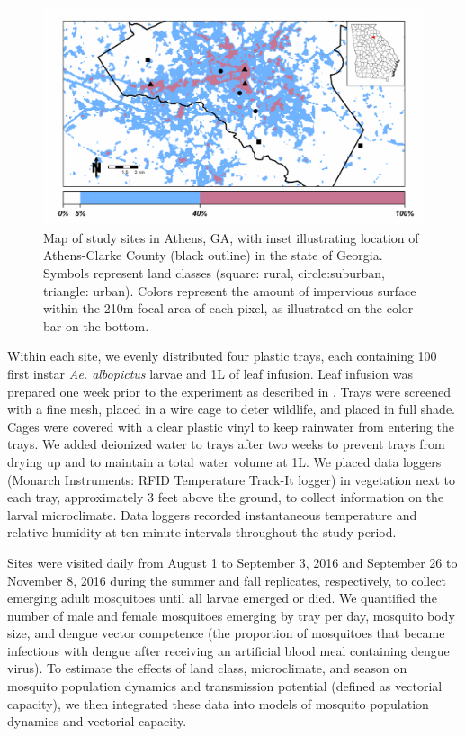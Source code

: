 \documentclass[12pt]{article}
\begin{document}
\begin{figure}
\centering\includegraphics[width=0.9\linewidth]{Figure1.pdf}
\caption{Map of study sites in Athens, GA, with inset illustrating location of Athens-Clarke County (black outline) in the state of Georgia. Symbols represent land classes (square: rural, circle:suburban, triangle: urban). Colors represent the amount of impervious surface within the 210m focal area of each pixel, as illustrated on the color bar on the bottom.}
\label{Fig:siteMap}
\end{figure}

Within each site, we evenly distributed four plastic trays, each containing 100 first instar \textit{Ae. albopictus} larvae and 1L of leaf infusion. Leaf infusion was prepared one week prior to the experiment as described in \citet{murdock2017}.  Trays were screened with a fine mesh, placed in a wire cage to deter wildlife, and placed in full shade. Cages were covered with a clear plastic vinyl to keep rainwater from entering the trays. We added deionized water to trays after two weeks to prevent trays from drying up and to maintain a total water volume at 1L. We placed data loggers (Monarch Instruments: RFID Temperature Track-It logger) in vegetation next to each tray, approximately 3 feet above the ground, to collect information on the larval microclimate. Data loggers recorded instantaneous temperature and relative humidity at ten minute intervals throughout the study period.

Sites were visited daily from August 1 to September 3, 2016 and September 26 to November 8, 2016 during the summer and fall replicates, respectively, to collect emerging adult mosquitoes until all larvae emerged or died. We quantified the number of male and female mosquitoes emerging by tray per day, mosquito body size, and dengue vector competence (the proportion of mosquitoes that became infectious with dengue after receiving an artificial blood meal containing dengue virus). To estimate the effects of land class, microclimate, and season on mosquito population dynamics and transmission potential (defined as vectorial capacity), we then integrated these data into models of mosquito population dynamics and vectorial capacity.
\end{document}
